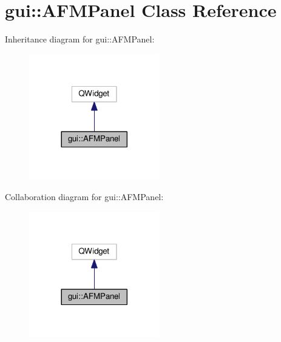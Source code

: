 \hypertarget{classgui_1_1AFMPanel}{}\section{gui\+:\+:A\+F\+M\+Panel Class Reference}
\label{classgui_1_1AFMPanel}


Inheritance diagram for gui\+:\+:A\+F\+M\+Panel\+:\nopagebreak
\begin{figure}[H]
\begin{center}
\leavevmode
\includegraphics[width=161pt]{classgui_1_1AFMPanel__inherit__graph}
\end{center}
\end{figure}


Collaboration diagram for gui\+:\+:A\+F\+M\+Panel\+:\nopagebreak
\begin{figure}[H]
\begin{center}
\leavevmode
\includegraphics[width=161pt]{classgui_1_1AFMPanel__coll__graph}
\end{center}
\end{figure}
